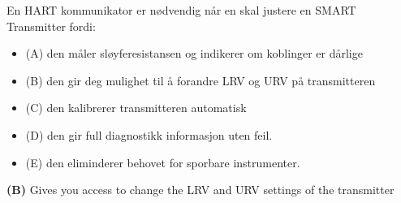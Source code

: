 


En HART kommunikator er nødvendig når en skal justere en SMART Transmitter fordi:

\begin{itemize}
\item{(A)} den måler sløyferesistansen og indikerer om koblinger er dårlige
\vskip 5pt 
\item{(B)} den gir deg mulighet til å forandre LRV og URV på transmitteren
\vskip 5pt 
\item{(C)} den kalibrerer transmitteren automatisk
\vskip 5pt 
\item{(D)} den gir full diagnostikk informasjon uten feil.
\vskip 5pt 
\item{(E)} den eliminderer behovet for sporbare instrumenter. 
\end{itemize}







{\bf (B)} Gives you access to change the LRV and URV settings of the transmitter
 









